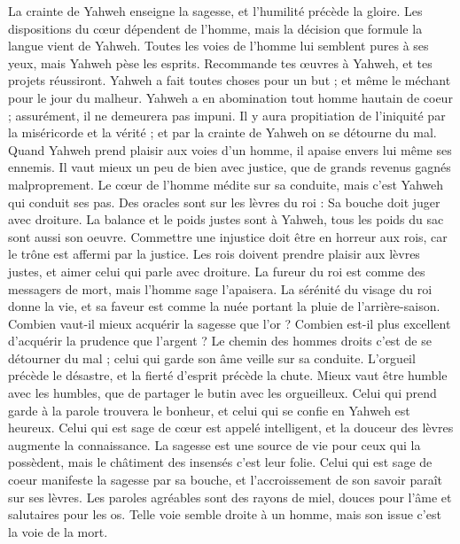 \begin{multicols}{2}
La crainte de Yahweh enseigne la sagesse, et l'humilité précède la gloire.
\VerseOne{}Les dispositions du cœur dépendent de l'homme, mais la décision que formule la langue vient de Yahweh.
Toutes les voies de l'homme lui semblent pures à ses yeux, mais Yahweh pèse les esprits.
Recommande tes œuvres à Yahweh, et tes projets réussiront.
Yahweh a fait toutes choses pour un but ; et même le méchant pour le jour du malheur.
Yahweh a en abomination tout homme hautain de coeur ; assurément, il ne demeurera pas impuni.
Il y aura propitiation de l'iniquité par la miséricorde et la vérité ; et par la crainte de Yahweh on se détourne du mal.
Quand Yahweh prend plaisir aux voies d'un homme, il apaise\FTNT{} envers lui même ses ennemis.
Il vaut mieux un peu de bien avec justice, que de grands revenus gagnés malproprement.
Le cœur de l'homme médite sur sa conduite, mais c’est Yahweh qui conduit ses pas.
Des oracles sont sur les lèvres du roi : Sa bouche doit juger avec droiture.
La balance et le poids justes sont à Yahweh, tous les poids du sac sont aussi son oeuvre.
Commettre une injustice doit être en horreur aux rois, car le trône est affermi par la justice.
Les rois doivent prendre plaisir aux lèvres justes, et aimer celui qui parle avec droiture.
La fureur du roi est comme des messagers de mort, mais l'homme sage l'apaisera.
La sérénité du visage du roi donne la vie, et sa faveur est comme la nuée portant la pluie de l’arrière-saison.
Combien vaut-il mieux acquérir la sagesse que l’or ? Combien est-il plus excellent d'acquérir la prudence que l'argent ?
Le chemin des hommes droits c'est de se détourner du mal ; celui qui garde son âme veille sur sa conduite.
L'orgueil précède le désastre, et la fierté d'esprit précède la chute.
Mieux vaut être humble avec les humbles, que de partager le butin avec les orgueilleux.
Celui qui prend garde à la parole trouvera le bonheur, et celui qui se confie en Yahweh est heureux.
Celui qui est sage de cœur est appelé intelligent, et la douceur des lèvres augmente la connaissance.
La sagesse est une source de vie pour ceux qui la possèdent, mais le châtiment des insensés c’est leur folie.
Celui qui est sage de coeur manifeste la sagesse par sa bouche, et l’accroissement de son savoir paraît sur ses lèvres.
Les paroles agréables sont des rayons de miel, douces pour l'âme et salutaires pour les os.
Telle voie semble droite à un homme, mais son issue c’est la voie de la mort.

\end{multicols}
